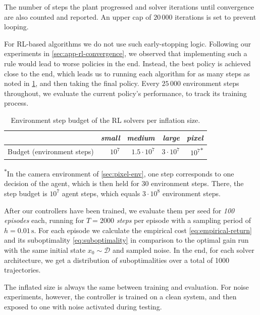 The number of steps the plant progressed and solver iterations until convergence are also
counted and reported. An upper cap of $20\,000$ iterations is set to prevent looping.

For RL-based algorithms we do not use such early-stopping logic. Following our experiments in
\cref{sec:app-rl-convergence}, we observed that implementing such a rule would lead to worse
policies in the end. Instead, the best policy is achieved close to the end, which leads us
to running each algorithm for as many steps as noted in \cref{tab:rl-step-caps}, and then
taking the final policy. Every $25\,000$ environment steps throughout, we
evaluate the current policy's performance, to track its training process.
\begin{table}[htbp]
    \centering
    \caption{Environment step budget of the RL solvers per inflation size.}
    \label{tab:rl-step-caps}
    \begin{tabular}{@{}lrrrr@{}}
        \toprule
        & \emph{small} & \emph{medium} & \emph{large} & \emph{pixel} \\
        \midrule
        Budget (environment steps) & $10^{7}$ & $1.5 \cdot 10^{7}$ & $3 \cdot 10^{7}$ & $10^{7}$\textsuperscript{$*$} \\
        \bottomrule
    \end{tabular}

    \smallskip
    {\footnotesize \textsuperscript{$*$}In the camera environment of \cref{sec:pixel-env}, one step corresponds to one decision
    of the agent, which is then held for $30$ environment steps. There, the step budget is $10^{7}$ agent steps, which equals
    $3 \cdot 10^{8}$ environment steps.\par}
\end{table}

After our controllers have been trained, we evaluate them per seed for \emph{100 episodes}
each, running for \emph{$T = 2000$ steps} per episode with a sampling period of $h = 0.01\,\mathrm{s}$.
For each episode we calculate the empirical cost \eqref{eq:empirical-return} and its
suboptimality \eqref{eq:suboptimality} in comparison to the optimal gain run with the same initial state
$x_0 \sim \mathcal{D}$ and sampled noise. In the end, for each solver architecture,
we get a distribution of suboptimalities over a total of 1000 trajectories.

The inflated size is always the same between training and evaluation. For noise
experiments, however, the controller is trained on a clean system, and then exposed to one with noise
activated during testing.

